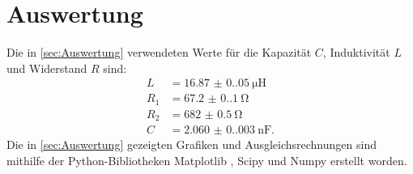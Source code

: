 \section{Auswertung}
\label{sec:Auswertung}
Die in \autoref{sec:Auswertung} verwendeten Werte für die Kapazität $C$, Induktivität $L$ und Widerstand $R$ sind:
\begin{align*}
  L &= \SI{16.87(0.05)}{\micro\henry} \\
  R_1 &= \SI{67.2(0.1)}{\ohm}\\
  R_2 &= \SI{682(0.5)}{\ohm}\\
  C &= \SI{2.060(0.003)}{\nano\farad}.
\end{align*}
Die in \autoref{sec:Auswertung} gezeigten Grafiken und Ausgleichsrechnungen sind mithilfe der Python-Bibliotheken Matplotlib \cite{matplotlib}, Scipy \cite{scipy} und Numpy \cite{numpy}
erstellt worden.
